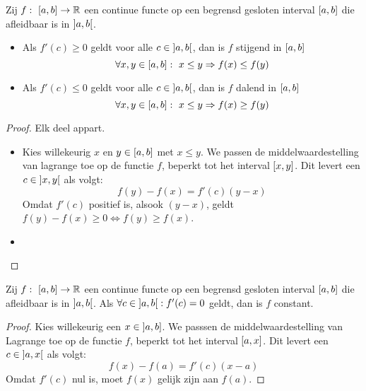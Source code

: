 \documentclass[main.tex]{subfiles}
\begin{document}
\begin{pr}
  Zij $f:\ \interval{a}{b} \rightarrow \mathbb{R}$ een continue functe op een begrensd gesloten interval $\interval{a}{b}$ die afleidbaar is in $\interval[open]{a}{b}$.
  \begin{itemize}
  \item Als $f'(c) \ge 0$ geldt voor alle $c \in \interval[open]{a}{b}$, dan is $f$ stijgend in $\interval{a}{b}$
    \[ \forall x,y \in \interval{a}{b}:\ x \le y \Rightarrow f(x) \le f(y) \]
  \item Als $f'(c) \le 0$ geldt voor alle $c \in \interval[open]{a}{b}$, dan is $f$ dalend in $\interval{a}{b}$
    \[ \forall x,y \in \interval{a}{b}:\ x \le y \Rightarrow f(x) \ge f(y) \]
  \end{itemize}

  \begin{proof}
    Elk deel appart.
    \begin{itemize}
    \item Kies willekeurig $x$ en $y \in \interval{a}{b}$ met $x\le y$.
      We passen de middelwaardestelling van lagrange toe op de functie $f$, beperkt tot het interval $\interval{x}{y}$.
      Dit levert een $c\in \interval[open]{x}{y}$ als volgt:
      \[ f(y)-f(x) = f'(c)(y-x) \]
      Omdat $f'(c)$ positief is, alsook $(y-x)$, geldt $f(y)-f(x) \ge 0 \Leftrightarrow f(y) \ge f(x)$.
    \item {}
    \end{itemize}
  \end{proof}
\end{pr}

\begin{pr}
  Zij $f:\ \interval{a}{b} \rightarrow \mathbb{R}$ een continue functe op een begrensd gesloten interval $\interval{a}{b}$ die afleidbaar is in $\interval[open]{a}{b}$.
  Als $\forall c\in \interval[open]{a}{b}: f'(c) = 0$ geldt, dan is $f$ constant.

  \begin{proof}
    Kies willekeurig een $x\in \interval[open left]{a}{b}$.
    We passsen de middelwaardestelling van Lagrange toe op de functie $f$, beperkt tot het interval $\interval{a}{x}$.
    Dit levert een $c\in \interval[open]{a}{x}$ als volgt:
    \[ f(x)-f(a) = f'(c)(x-a) \]
    Omdat $f'(c)$ nul is, moet $f(x)$ gelijk zijn aan $f(a)$.
  \end{proof}
\end{pr}
\end{document}

